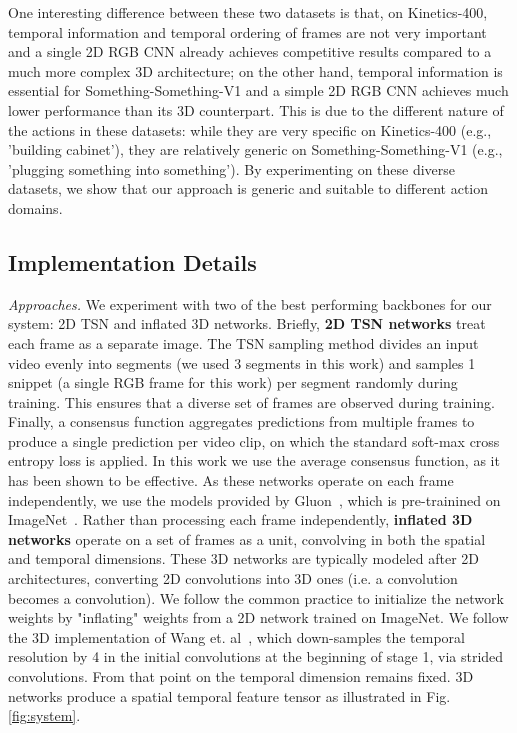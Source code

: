 \documentclass[10pt,twocolumn,letterpaper]{article}
\begin{document}
One interesting difference between these two datasets is that, on Kinetics-400, temporal information and temporal ordering of frames are not very important and a single 2D RGB CNN already achieves competitive results compared to a much more complex 3D architecture; on the other hand, temporal information is essential for Something-Something-V1 and a simple 2D RGB CNN achieves much lower performance than its 3D counterpart. This is due to the different nature of the actions in these datasets: while they are very specific on Kinetics-400 (e.g., 'building  cabinet'), they are relatively generic on Something-Something-V1 (e.g., 'plugging something into something'). By experimenting on these diverse datasets, we show that our approach is generic and suitable to different action domains.


\subsection{Implementation Details}
\label{sec:imp_dets}

\textit{Approaches.} We experiment with two of the best performing backbones for our system: 2D TSN \cite{TSN_TPAMI18} and inflated 3D \cite{Inflated3D_CVPR17} networks. Briefly, {\bf2D TSN networks} treat each frame as a separate image. The TSN sampling method divides an input video evenly into segments (we used 3 segments in this work) and samples 1 snippet (a single RGB frame for this work) per segment randomly during training. This ensures that a diverse set of frames are observed during training. Finally, a consensus function aggregates predictions from multiple frames to produce a single prediction per video clip, on which the standard soft-max cross entropy loss is applied. In this work we use the average consensus function, as it has been shown to be effective. As these networks operate on each frame independently, we use the models provided by Gluon~\cite{chen15arxiv}, which is pre-trainined on ImageNet~\cite{ImageNet_CVPR09}.
Rather than processing each frame independently, {\bf inflated 3D networks} operate on a set of frames as a unit, convolving in both the spatial and temporal dimensions. These 3D networks are typically modeled after 2D architectures, converting 2D convolutions into 3D ones (i.e. a  convolution becomes a  convolution). We follow the common practice to initialize the network weights by "inflating" \cite{Inflated3D_CVPR17} weights from a 2D network trained on ImageNet. We follow the 3D implementation of Wang et. al~\cite{NonLocalNN_CVPR18}, which down-samples the temporal resolution by 4 in the initial convolutions at the beginning of stage 1, via strided convolutions. From that point on the temporal dimension remains fixed. 3D networks produce a spatial temporal feature tensor as illustrated in Fig. \ref{fig:system}.
\end{document}
